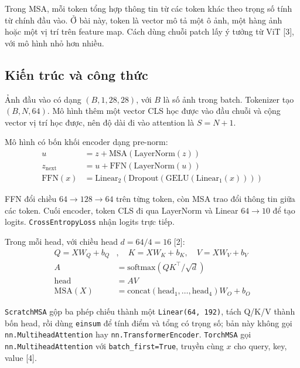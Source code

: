 \documentclass[12pt,a4paper]{article}
\begin{document}
Trong MSA, mỗi token tổng hợp thông tin từ các token khác theo trọng số tính
từ chính đầu vào. Ở bài này, token là vector mô tả một ô ảnh, một hàng ảnh
hoặc một vị trí trên feature map. Cách dùng chuỗi patch lấy ý tưởng từ ViT
[3], với mô hình nhỏ hơn nhiều.

\subsection{Kiến trúc và công thức}

Ảnh đầu vào có dạng $(B, 1, 28, 28)$, với $B$ là số ảnh trong batch. Tokenizer
tạo $(B, N, 64)$. Mô hình thêm một vector CLS học được vào đầu chuỗi và cộng
vector vị trí học được, nên độ dài đi vào attention là $S = N + 1$.

Mô hình có bốn khối encoder dạng pre-norm:
\begin{align*}
u &= z + \text{MSA}(\text{LayerNorm}(z)) \\
z_{\text{next}} &= u + \text{FFN}(\text{LayerNorm}(u)) \\
\text{FFN}(x) &= \text{Linear}_2(\text{Dropout}(\text{GELU}(\text{Linear}_1(x))))
\end{align*}

FFN đổi chiều $64 \to 128 \to 64$ trên từng token, còn MSA trao đổi thông tin
giữa các token. Cuối encoder, token CLS đi qua LayerNorm và Linear $64 \to 10$
để tạo logits. \texttt{CrossEntropyLoss} nhận logits trực tiếp.

Trong mỗi head, với chiều head $d = 64/4 = 16$ [2]:
\begin{align*}
Q = XW_Q + b_Q&, \quad K = XW_K + b_K, \quad V = XW_V + b_V \\
A &= \text{softmax}(QK^\top / \sqrt{d}) \\
\text{head} &= AV \\
\text{MSA}(X) &= \text{concat}(\text{head}_1, \ldots, \text{head}_4)W_O + b_O
\end{align*}

\texttt{ScratchMSA} gộp ba phép chiếu thành một \texttt{Linear(64, 192)}, tách
Q/K/V thành bốn head, rồi dùng \texttt{einsum} để tính điểm và tổng có trọng
số; bản này không gọi \texttt{nn.MultiheadAttention} hay
\texttt{nn.TransformerEncoder}. \texttt{TorchMSA} gọi
\texttt{nn.MultiheadAttention} với \texttt{batch\_first=True}, truyền cùng $x$
cho query, key, value [4].
\end{document}
